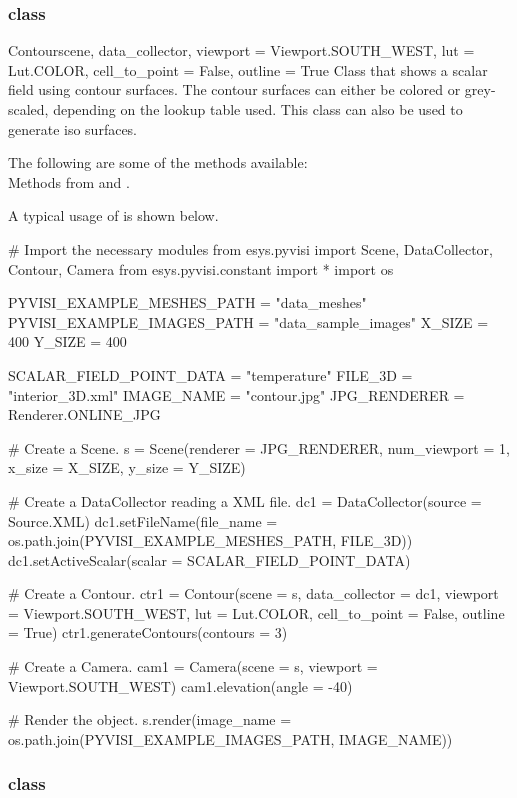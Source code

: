 \subsubsection{\Contour class}

\begin{classdesc}{Contour}{scene, data_collector, 
viewport = Viewport.SOUTH_WEST, lut = Lut.COLOR, cell_to_point = False, 
outline = True}
Class that shows a scalar field using contour surfaces. The contour surfaces can
either be colored or grey-scaled, depending on the lookup table used. This
class can also be used to generate iso surfaces.
\end{classdesc}

The following are some of the methods available:\\
Methods from \ActorThreeD and \ContourModule. 

A typical usage of \Contour is shown below.

\begin{python}
# Import the necessary modules
from esys.pyvisi import Scene, DataCollector, Contour, Camera
from esys.pyvisi.constant import *
import os

PYVISI_EXAMPLE_MESHES_PATH = "data_meshes"
PYVISI_EXAMPLE_IMAGES_PATH = "data_sample_images"
X_SIZE = 400
Y_SIZE = 400

SCALAR_FIELD_POINT_DATA = "temperature"
FILE_3D = "interior_3D.xml"
IMAGE_NAME = "contour.jpg"
JPG_RENDERER = Renderer.ONLINE_JPG

# Create a Scene.
s = Scene(renderer = JPG_RENDERER, num_viewport = 1, x_size = X_SIZE, 
        y_size = Y_SIZE)

# Create a DataCollector reading a XML file.
dc1 = DataCollector(source = Source.XML)
dc1.setFileName(file_name = os.path.join(PYVISI_EXAMPLE_MESHES_PATH, FILE_3D))
dc1.setActiveScalar(scalar = SCALAR_FIELD_POINT_DATA)

# Create a Contour.
ctr1 = Contour(scene = s, data_collector = dc1, viewport = Viewport.SOUTH_WEST,
        lut = Lut.COLOR, cell_to_point = False, outline = True)
ctr1.generateContours(contours = 3)

# Create a Camera.
cam1 = Camera(scene = s, viewport = Viewport.SOUTH_WEST)
cam1.elevation(angle = -40)

# Render the object.
s.render(image_name = os.path.join(PYVISI_EXAMPLE_IMAGES_PATH, IMAGE_NAME))
\end{python}

\subsubsection{\ContourOnPlaneCut class}

